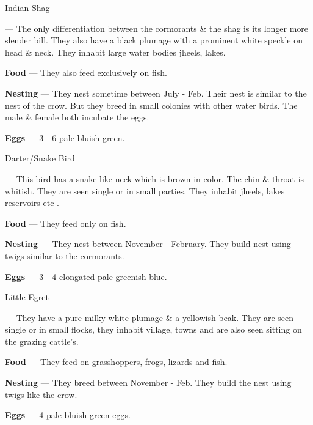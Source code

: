 \begin{bird}{Indian Shag}

 --- The only differentiation between the cormorants \& the shag is its longer more slender bill. They also have a black plumage with a prominent white speckle on head \& neck. They inhabit large water bodies jheels, lakes.

{\large\bf Food} --- They also feed exclusively on fish.

{\large\bf Nesting} --- They nest sometime between July - Feb. Their nest is similar to the nest of the crow. But they breed in small colonies with other water birds. The male \& female both incubate the eggs. 

{\large\bf Eggs} --- 3 - 6 pale bluish green.
\end{bird}
\newpage

\begin{bird}{Darter/Snake Bird}

 --- This bird has a snake like neck which is brown in color. The chin \& throat is whitish. They are seen single or in small parties. They inhabit jheels, lakes reservoirs etc .

{\large\bf Food} --- They feed only on fish. 

{\large\bf Nesting} --- They nest between November - February. They build nest using twigs similar to the cormorants.

{\large\bf Eggs} --- 3 - 4 elongated pale greenish blue.
\end{bird}

\begin{bird}{Little Egret}

 --- They have a pure milky white plumage \& a yellowish beak. They are seen single or in small flocks, they inhabit village, towns and are also seen sitting on the grazing cattle's.

{\large\bf Food} --- They feed on grasshoppers, frogs, lizards and fish.

{\large\bf Nesting} --- They breed between November - Feb. They build the nest using twigs like the crow.

{\large\bf Eggs} --- 4 pale bluish green eggs.
\end{bird}

